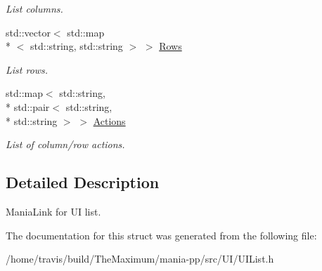 \begin{DoxyCompactItemize}
\begin{DoxyCompactList}\small\item\em List columns. \end{DoxyCompactList}\item 
\hypertarget{structUIList_a065ea3da2ed6cb0524e9a0daae2be06a}{std\-::vector$<$ std\-::map\\*
$<$ std\-::string, std\-::string $>$ $>$ \hyperlink{structUIList_a065ea3da2ed6cb0524e9a0daae2be06a}{Rows}}\label{structUIList_a065ea3da2ed6cb0524e9a0daae2be06a}

\begin{DoxyCompactList}\small\item\em List rows. \end{DoxyCompactList}\item 
\hypertarget{structUIList_aefc14c8b15732c34a99a27330e1f7691}{std\-::map$<$ std\-::string, \\*
std\-::pair$<$ std\-::string, \\*
std\-::string $>$ $>$ \hyperlink{structUIList_aefc14c8b15732c34a99a27330e1f7691}{Actions}}\label{structUIList_aefc14c8b15732c34a99a27330e1f7691}

\begin{DoxyCompactList}\small\item\em List of column/row actions. \end{DoxyCompactList}\end{DoxyCompactItemize}


\subsection{Detailed Description}
Mania\-Link for U\-I list. 

The documentation for this struct was generated from the following file\-:\begin{DoxyCompactItemize}
\item 
/home/travis/build/\-The\-Maximum/mania-\/pp/src/\-U\-I/U\-I\-List.\-h\end{DoxyCompactItemize}
